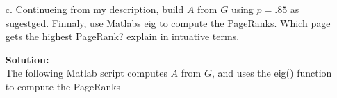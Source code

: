 \documentclass[12pt]{article}
\makeatletter
\theoremstyle{homework}
\newenvironment{exercise}[1]
{\def\@currentlabel{#1}\exercisecore}
{\endexercisecore}
\newcommand{\localhead}[1]{\par\smallskip\noindent\textbf{#1}\nobreak\\}%
\newcommand\solution{\localhead{Solution:}}
\makeatother
\begin{document}
\begin{exercise}{P22}
\begin{enumerate}
 \item[c.] Continueing from my description, build $A$ from $G$ using $p = .85$ as sugestged. Finnaly, use Matlabs eig to compute the PageRanks. Which page gets the highest PageRank?
 explain in intuative terms.\\
 \solution The following Matlab script computes $A$ from $G$, and uses the eig() function to compute the PageRanks




\end{enumerate}

  \end{exercise}
\end{document}
